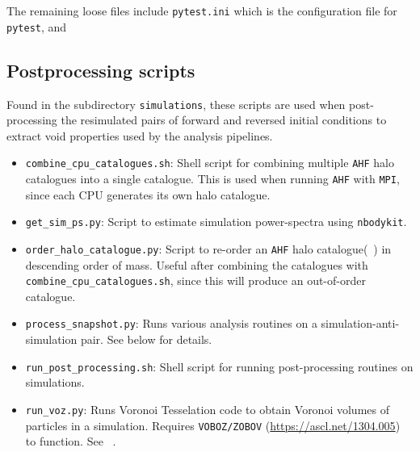 \documentclass{article}
\newcommand{\codefont}[1]{{\texttt{#1}}}
\begin{document}
	The remaining loose files include \codefont{pytest.ini} which is the configuration file for \codefont{pytest}, and 
	
	\subsection{Postprocessing scripts}
	
	Found in the subdirectory \codefont{simulations}, these scripts are used when post-processing the resimulated pairs of forward and reversed initial conditions to extract void properties used by the analysis pipelines.
	
	\label{sec:postprocessing}
	\begin{itemize}
		\item \codefont{combine\_cpu\_catalogues.sh}: Shell script for combining multiple \codefont{AHF} halo catalogues into a single catalogue. This is used when running \codefont{AHF} with \codefont{MPI}, since each CPU generates its own halo catalogue.
		\item \codefont{get\_sim\_ps.py}: Script to estimate simulation power-spectra using \codefont{nbodykit}.
		\item \codefont{order\_halo\_catalogue.py}: Script to re-order an \codefont{AHF} halo catalogue(~\citet{AHF}) in descending order of mass. Useful after combining the catalogues with \codefont{combine\_cpu\_catalogues.sh}, since this will produce an out-of-order catalogue.
		\item \codefont{process\_snapshot.py}: Runs various analysis routines on a simulation-anti-simulation pair. See below for details.
		\item \codefont{run\_post\_processing.sh}: Shell script for running post-processing routines on simulations.
		\item \codefont{run\_voz.py}: Runs Voronoi Tesselation code to obtain Voronoi volumes of particles in a simulation. Requires \codefont{VOBOZ/ZOBOV} (\url{https://ascl.net/1304.005}) to function. See ~\citet{neyrinck2005voboz}.
	\end{itemize}
	
\end{document}
